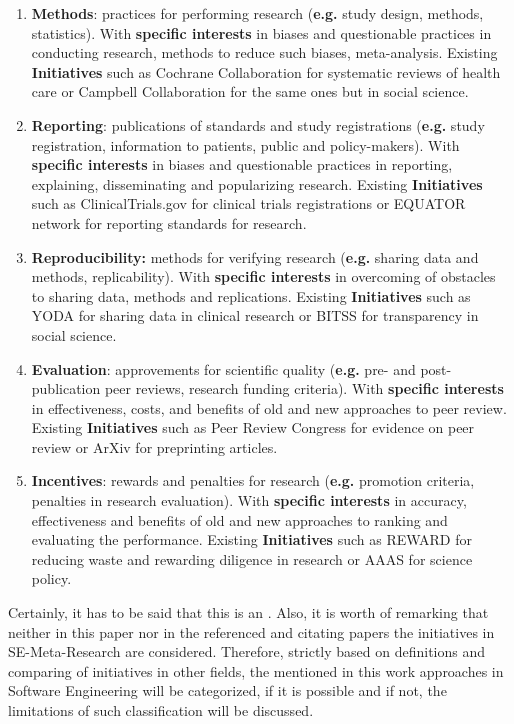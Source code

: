 		\begin{enumerate}
			\item{\textbf{Methods}:} practices for performing research  (\textbf{e.g.} study design, methods, statistics). With \textbf{specific interests} in biases and questionable practices in conducting
			research, methods to reduce such biases, meta-analysis. Existing \textbf{Initiatives} such as Cochrane Collaboration for systematic reviews of health care or Campbell Collaboration for the same ones but in social science.
			   
			\item{\textbf{Reporting}:} publications of standards and study registrations  (\textbf{e.g.} study registration, information to patients, public and policy-makers). With \textbf{specific interests} in biases and questionable practices in reporting, explaining, disseminating and popularizing research. Existing \textbf{Initiatives} such as ClinicalTrials.gov for clinical trials registrations or EQUATOR network for reporting standards for research.
			
			\item\textbf{{Reproducibility}:} methods for verifying research (\textbf{e.g.} sharing data and methods, replicability). With \textbf{specific interests} in overcoming of obstacles to sharing data, methods and replications. Existing \textbf{Initiatives} such as YODA for sharing data in clinical research or BITSS for transparency in social science. 
			
			\item{\textbf{Evaluation}:} approvements for scientific quality (\textbf{e.g.} pre- and post-publication peer reviews, research funding criteria). With \textbf{specific interests} in  effectiveness, costs, and benefits of old and new approaches to peer review. Existing \textbf{Initiatives} such as Peer Review Congress for evidence on peer review or ArXiv for preprinting articles. 
			 
			\item{\textbf{Incentives}:} rewards and penalties for research (\textbf{e.g.} promotion criteria, penalties in research evaluation). With \textbf{specific interests} in accuracy, effectiveness and benefits of old and new approaches to ranking and evaluating the performance. Existing \textbf{Initiatives} such as REWARD for reducing waste and rewarding diligence in research or AAAS for science policy.
		\end{enumerate}
		 Certainly, it has to be said that this is an \frqq. Also, it is worth of remarking that neither in this paper nor in the referenced and citating papers the initiatives in SE-Meta-Research are considered. Therefore, strictly based on definitions and comparing of initiatives in other fields, the mentioned in this work approaches in Software Engineering will be categorized, if it is possible and if not, the limitations of such classification will be discussed. 
		
